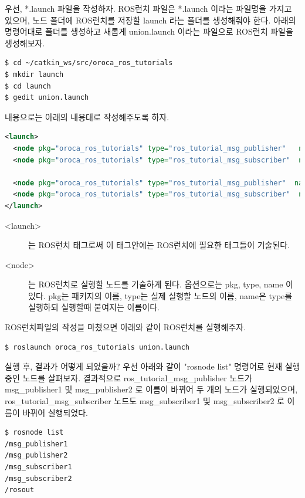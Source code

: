 우선, *.launch 파일을 작성하자. ROS런치 파일은 *.launch 이라는 파일명을 가지고 있으며, 노드 폴더에 ROS런치를 저장할 launch 라는 폴더를 생성해줘야 한다. 아래의 명령어대로 폴더를 생성하고 새롭게 union.launch 이라는 파일으로 ROS런치 파일을 생성해보자.

\begin{lstlisting}[language=ROS]
$ cd ~/catkin_ws/src/oroca_ros_tutorials
$ mkdir launch
$ cd launch
$ gedit union.launch
\end{lstlisting}

내용으로는 아래의 내용대로 작성해주도록 하자.

\begin{lstlisting}[language=XML]
<launch>
  <node pkg="oroca_ros_tutorials" type="ros_tutorial_msg_publisher"   name="msg_publisher1"/>
  <node pkg="oroca_ros_tutorials" type="ros_tutorial_msg_subscriber"  name="msg_subscriber1"/>

  <node pkg="oroca_ros_tutorials" type="ros_tutorial_msg_publisher"  name="msg_publisher2"/>
  <node pkg="oroca_ros_tutorials" type="ros_tutorial_msg_subscriber"  name="msg_subscriber2"/>
</launch>
\end{lstlisting}

\begin{description}
\item[\textless launch\textgreater] 는 ROS런치 태그로써 이 태그안에는 ROS런치에 필요한 태그들이 기술된다.
\item[\textless node\textgreater] 는 ROS런치로 실행할 노드를 기술하게 된다. 옵션으로는 pkg, type, name 이 있다. pkg는 패키지의 이름, type는 실제 실행할 노드의 이름, name은 type를 실행하되 실행할때 붙여지는 이름이다.  
\end{description}

ROS런치파일의 작성을 마쳤으면 아래와 같이 ROS런치를 실행해주자.

\begin{lstlisting}[language=ROS]
$ roslaunch oroca_ros_tutorials union.launch
\end{lstlisting}

실행 후, 결과가 어떻게 되었을까? 우선 아래와 같이 "rosnode list" 명령어로 현재 실행중인 노드를 살펴보자. 결과적으로  ros\_tutorial\_msg\_publisher 노드가 msg\_publisher1 및 msg\_publisher2 로 이름이 바뀌어 두 개의 노드가 실행되었으며, ros\_tutorial\_msg\_subscriber 노드도  msg\_subscriber1 및 msg\_subscriber2 로 이름이 바뀌어 실행되었다.  

\begin{lstlisting}[language=ROS]
$ rosnode list
/msg_publisher1
/msg_publisher2
/msg_subscriber1
/msg_subscriber2
/rosout
\end{lstlisting}

